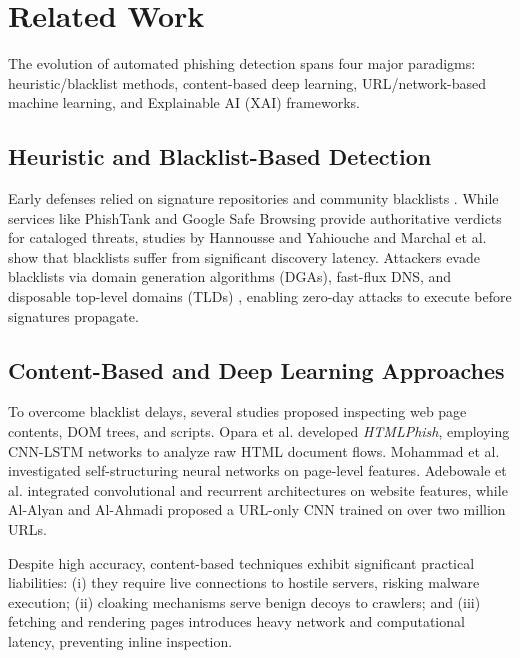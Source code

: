 \section{Related Work}
\label{sec:related_work}

The evolution of automated phishing detection spans four major paradigms: heuristic/blacklist methods, content-based deep learning, URL/network-based machine learning, and Explainable AI (XAI) frameworks.

\subsection{Heuristic and Blacklist-Based Detection}
Early defenses relied on signature repositories and community blacklists \cite{sahoo2017malicious}. While services like PhishTank and Google Safe Browsing provide authoritative verdicts for cataloged threats, studies by Hannousse and Yahiouche \cite{hannousse2021towards} and Marchal et al. \cite{marchal2017off} show that blacklists suffer from significant discovery latency. Attackers evade blacklists via domain generation algorithms (DGAs), fast-flux DNS, and disposable top-level domains (TLDs) \cite{sahoo2017malicious}, enabling zero-day attacks to execute before signatures propagate.

\subsection{Content-Based and Deep Learning Approaches}
To overcome blacklist delays, several studies proposed inspecting web page contents, DOM trees, and scripts. Opara et al. \cite{opara2020htmlphish} developed \textit{HTMLPhish}, employing CNN-LSTM networks to analyze raw HTML document flows. Mohammad et al. \cite{mohammad2014predicting} investigated self-structuring neural networks on page-level features. Adebowale et al. \cite{adebowale2023intelligent} integrated convolutional and recurrent architectures on website features, while Al-Alyan and Al-Ahmadi \cite{alalyan2020robust} proposed a URL-only CNN trained on over two million URLs.

Despite high accuracy, content-based techniques exhibit significant practical liabilities: (i) they require live connections to hostile servers, risking malware execution; (ii) cloaking mechanisms serve benign decoys to crawlers; and (iii) fetching and rendering pages introduces heavy network and computational latency, preventing inline inspection.

